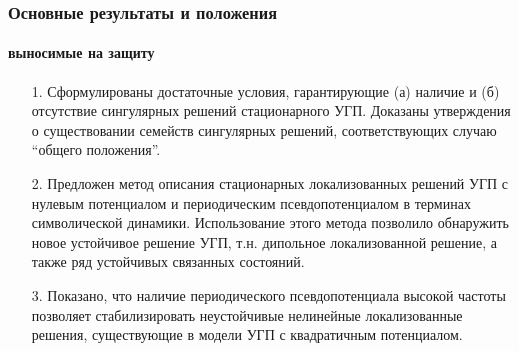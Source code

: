 \documentclass [10pt] {beamer}
\begin{document}

\begin{frame}
	\frametitle{Основные результаты и положения}
	\framesubtitle{выносимые на защиту}

	\begin{small}
	\begin{itemize}
		\setlength\itemsep{10pt}
		\item[1.] Сформулированы достаточные условия, гарантирующие {\color{ceruleanblue} (а)} наличие и {\color{ceruleanblue} (б)} отсутствие сингулярных решений стационарного УГП.
		Доказаны утверждения о существовании семейств сингулярных решений, соответствующих случаю ``общего положения''.
		\item[2.] Предложен метод описания стационарных локализованных решений УГП с нулевым потенциалом и периодическим псевдопотенциалом в терминах символической динамики.
		Использование этого метода позволило обнаружить новое устойчивое решение УГП, т.н. дипольное локализованной решение, а также ряд устойчивых связанных состояний.
		\item[3.] Показано, что наличие периодического псевдопотенциала высокой частоты позволяет стабилизировать неустойчивые нелинейные локализованные решения, существующие в модели УГП с квадратичным потенциалом.
	\end{itemize}	
	\end{small}	
\end{frame}
\end{document}
